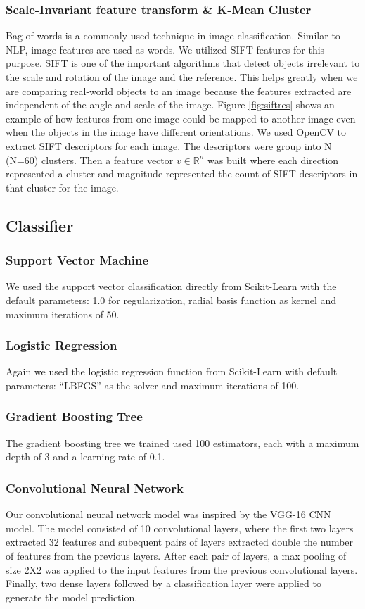 \documentclass[
	a4paper, %
	10pt, %
	unnumberedsections, %
	twoside, %
]{t0004}
\begin{document}
\subsubsection{Scale-Invariant feature transform \& K-Mean Cluster} Bag of words is a commonly used technique in image classification. Similar to NLP, image features are used as words. We utilized SIFT features for this purpose. SIFT is one of the important algorithms that detect objects irrelevant to the scale and rotation of the image and the reference. This helps greatly when we are comparing real-world objects to an image because the features extracted are independent of the angle and scale of the image. Figure \ref{fig:siftres} shows an example of how features from one image could be mapped to another image even when the objects in the image have different orientations. We used OpenCV to extract SIFT descriptors for each image. The descriptors were group into N (N=60) clusters. Then a feature vector \(v \in \mathbb{R}^n\)   was built where each direction represented a cluster and magnitude represented the count of SIFT descriptors in that cluster for the image.

\subsection{Classifier}

\subsubsection{Support Vector Machine} We used the support vector classification directly from Scikit-Learn with the default parameters: 1.0 for regularization, radial basis function as kernel and maximum iterations of 50. 

\subsubsection{Logistic Regression} Again we used the logistic regression function from Scikit-Learn with default parameters: ``LBFGS'' as the solver and maximum iterations of 100.

\subsubsection{Gradient Boosting Tree} The gradient boosting tree we trained used 100 estimators, each with a maximum depth of 3 and a learning rate of 0.1.

\subsubsection{Convolutional Neural Network}  Our convolutional neural network model was inspired by the VGG-16 CNN model. The model consisted of 10 convolutional layers, where the first two layers extracted 32 features and subequent pairs of layers extracted double the number of features from the previous layers. After each pair of layers, a max pooling of size 2X2 was applied to the input features from the previous convolutional layers. Finally, two dense layers followed by a classification layer were applied to generate the model prediction. 
\end{document}
